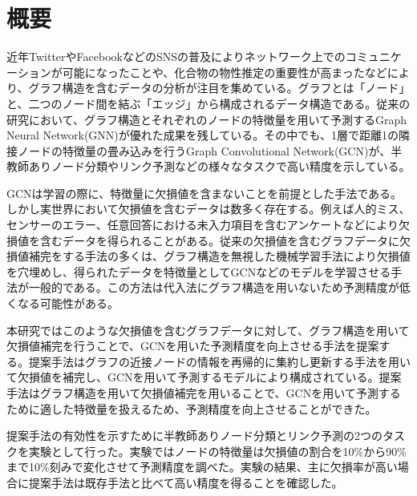 \chapter{概要}
近年TwitterやFacebookなどのSNSの普及によりネットワーク上でのコミュニケーションが可能になったことや、化合物の物性推定の重要性が高まったなどにより、グラフ構造を含むデータの分析が注目を集めている。グラフとは「ノード」と、二つのノード間を結ぶ「エッジ」から構成されるデータ構造である。従来の研究において、グラフ構造とそれぞれのノードの特徴量を用いて予測するGraph Neural Network(GNN)が優れた成果を残している。その中でも、1層で距離1の隣接ノードの特徴量の畳み込みを行うGraph Convolutional Network(GCN)が、半教師ありノード分類やリンク予測などの様々なタスクで高い精度を示している。

GCNは学習の際に、特徴量に欠損値を含まないことを前提とした手法である。しかし実世界において欠損値を含むデータは数多く存在する。例えば人的ミス、センサーのエラー、任意回答における未入力項目を含むアンケートなどにより欠損値を含むデータを得られることがある。従来の欠損値を含むグラフデータに欠損値補完をする手法の多くは、グラフ構造を無視した機械学習手法により欠損値を穴埋めし、得られたデータを特徴量としてGCNなどのモデルを学習させる手法が一般的である。この方法は代入法にグラフ構造を用いないため予測精度が低くなる可能性がある。
  
本研究ではこのような欠損値を含むグラフデータに対して、グラフ構造を用いて欠損値補完を行うことで、GCNを用いた予測精度を向上させる手法を提案する。提案手法はグラフの近接ノードの情報を再帰的に集約し更新する手法を用いて欠損値を補完し、GCNを用いて予測するモデルにより構成されている。提案手法はグラフ構造を用いて欠損値補完を用いることで、GCNを用いて予測するために適した特徴量を扱えるため、予測精度を向上させることができた。
  
提案手法の有効性を示すために半教師ありノード分類とリンク予測の2つのタスクを実験として行った。実験ではノードの特徴量は欠損値の割合を10\%から90\%まで10\%刻みで変化させて予測精度を調べた。実験の結果、主に欠損率が高い場合に提案手法は既存手法と比べて高い精度を得ることを確認した。
